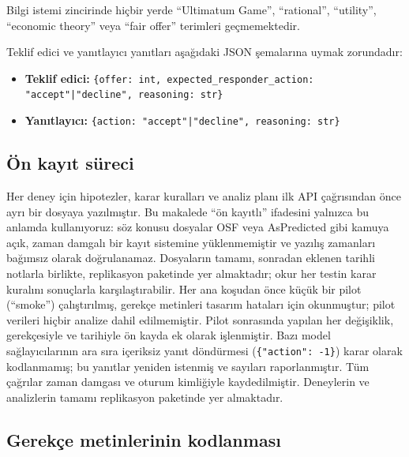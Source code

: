 \documentclass[11pt]{article}
\begin{document}
Bilgi istemi zincirinde hiçbir yerde ``Ultimatum Game'', ``rational'', ``utility'', ``economic theory'' veya ``fair offer'' terimleri geçmemektedir.

Teklif edici ve yanıtlayıcı yanıtları aşağıdaki JSON şemalarına uymak zorundadır:

\begin{itemize}
\item \textbf{Teklif edici:} \texttt{\{offer: int, expected\_responder\_action: "accept"|"decline", reasoning: str\}}
\item \textbf{Yanıtlayıcı:} \texttt{\{action: "accept"|"decline", reasoning: str\}}
\end{itemize}


\subsection{Ön kayıt süreci}\label{sec:prereg}

Her deney için hipotezler, karar kuralları ve analiz planı ilk API çağrısından önce ayrı bir dosyaya yazılmıştır. Bu makalede ``ön kayıtlı'' ifadesini yalnızca bu anlamda kullanıyoruz: söz konusu dosyalar OSF veya AsPredicted gibi kamuya açık, zaman damgalı bir kayıt sistemine yüklenmemiştir ve yazılış zamanları bağımsız olarak doğrulanamaz. Dosyaların tamamı, sonradan eklenen tarihli notlarla birlikte, replikasyon paketinde yer almaktadır; okur her testin karar kuralını sonuçlarla karşılaştırabilir. Her ana koşudan önce küçük bir pilot (``smoke'') çalıştırılmış, gerekçe metinleri tasarım hataları için okunmuştur; pilot verileri hiçbir analize dahil edilmemiştir. Pilot sonrasında yapılan her değişiklik, gerekçesiyle ve tarihiyle ön kayda ek olarak işlenmiştir. Bazı model sağlayıcılarının ara sıra içeriksiz yanıt döndürmesi (\texttt{\{"action": -1\}}) karar olarak kodlanmamış; bu yanıtlar yeniden istenmiş ve sayıları raporlanmıştır. Tüm çağrılar zaman damgası ve oturum kimliğiyle kaydedilmiştir. Deneylerin ve analizlerin tamamı replikasyon paketinde yer almaktadır.

\subsection{Gerekçe metinlerinin kodlanması}
\end{document}
